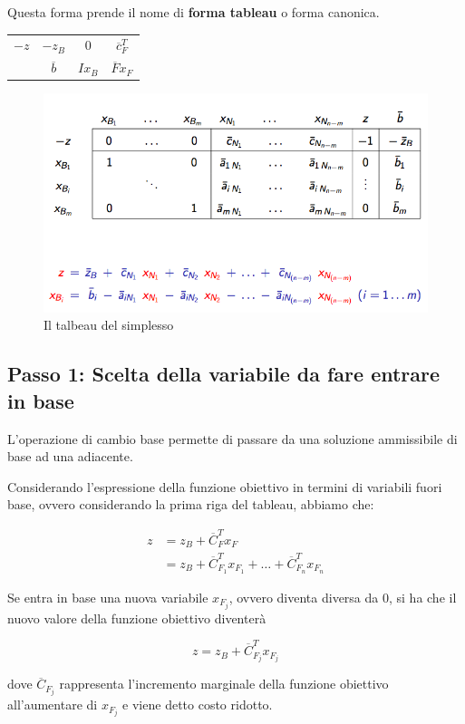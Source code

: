 Questa forma prende il nome di \textbf{forma tableau} o forma canonica.

\begin{table}[htbp]
\centering
\begin{tabular}{c|c|c|c|}
\cline{2-4}
$-z$ & $-z_B$           & $0$     & $\overline{c}_{F}^T$ \\ \cline{2-4} 
   & $\overline{b}$ & $Ix_B$ & $\overline{F}x_F$         \\ \cline{2-4} 
\end{tabular}
\end{table}

\begin{figure}[htbp]
	\centering
	\includegraphics[width = .7\textwidth]{images/l9-fig-3.png}
	\caption{Il talbeau del simplesso}
\end{figure}

\subsection{Passo 1: Scelta della variabile da fare entrare in base}

L'operazione di cambio base permette di passare da una soluzione ammissibile di base ad una adiacente.

Considerando l'espressione della funzione obiettivo in termini di variabili fuori base, ovvero considerando la prima riga del tableau, abbiamo che:

\begin{align*}
z &= z_B + \overline{C}_{F}^Tx_F \\
&= z_B + \overline{C}_{F_1}^Tx_{F_1} + \ldots + \overline{C}_{F_n}^Tx_{F_n}
\end{align*}

Se entra in base una nuova variabile $x_{F_j}$, ovvero diventa diversa da 0, si ha che il nuovo valore della funzione obiettivo diventerà

$$
z = z_B + \overline{C}_{F_j}^Tx_{F_j}
$$

dove $\overline{C}_{F_j}$ rappresenta l'incremento marginale della funzione obiettivo all'aumentare di $x_{F_j}$ e viene detto costo ridotto. 

